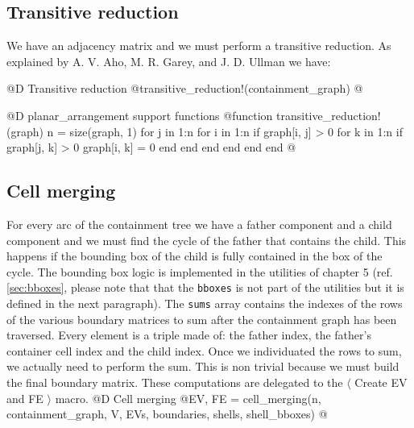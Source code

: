 \subsection{Transitive reduction}

We have an adjacency matrix and we must perform a transitive reduction.
As explained by A. V. Aho, M. R. Garey, and J. D. Ullman \cite{parallel_transitive_reduction}
we have:

@D Transitive reduction
@{transitive_reduction!(containment_graph) 
@}

@D planar\_arrangement support functions
@{function transitive_reduction!(graph)
    n = size(graph, 1)
    for j in 1:n
        for i in 1:n
            if graph[i, j] > 0
                for k in 1:n
                    if graph[j, k] > 0
                        graph[i, k] = 0
                    end
                end
            end
        end
    end
end
@}

\subsection{Cell merging}

For every arc of the containment tree we have a father component 
and a child component and we must find the cycle of the father that
contains the child. This happens if the bounding box of the child is fully
contained in the box of the cycle. The bounding box logic is implemented
in the utilities of chapter 5 (ref. \ref{sec:bboxes}, please note that
that the \texttt{bboxes} is not part of the utilities but it is defined 
in the next paragraph). The \texttt{sums} array contains the indexes of 
the rows of the various boundary matrices to sum after the containment 
graph has been traversed. Every element is a triple made of: the father 
index, the father's container cell index and the child index.
Once we individuated the rows to sum, we actually need to perform the sum.
This is non trivial because we must build the final boundary matrix.
These computations are delegated to the $\langle$ Create EV and FE $\rangle$ macro.
@D Cell merging 
@{EV, FE = cell_merging(n, containment_graph, V, EVs, boundaries, shells, shell_bboxes)
@}

